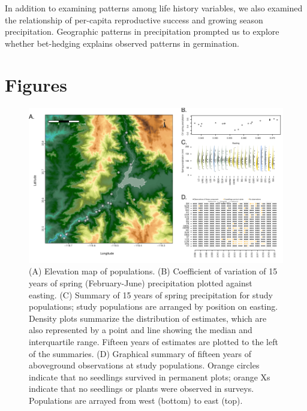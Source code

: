 \documentclass[12pt, oneside, titlepage]{article}   	%
\begin{document}
In addition to examining patterns among life history variables, we also examined the relationship of per-capita reproductive success and growing season precipitation. Geographic patterns in precipitation prompted us to explore whether bet-hedging explains observed patterns in germination.
\fi

\newpage
\clearpage
\section*{Figures} 

%

\begin{figure}[htb]
	\includegraphics[width=\textwidth]{../manuscript/figures/intro-figure.pdf}  
        \caption{ \footnotesize (A) Elevation map of populations. (B) Coefficient of variation of 15 years of spring (February-June) precipitation plotted against easting. (C) Summary of 15 years of spring precipitation for study populations; study populations are arranged by position on easting. Density plots summarize the distribution of estimates, which are also represented by a point and line showing the median and interquartile range. Fifteen years of estimates are plotted to the left of the summaries. (D) Graphical summary of fifteen years of aboveground observations at study populations. Orange circles indicate that no seedlings survived in permanent plots; orange Xs indicate that no seedlings or plants were observed in surveys. Populations are arrayed from west (bottom) to east (top). }
        \label{fig:intro-figure}
\end{figure}
\end{document}
